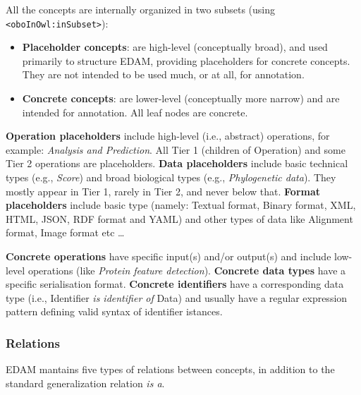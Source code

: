 \documentclass{scrartcl}
\begin{document}
All the concepts are internally organized in two subsets (using \texttt{<oboInOwl:inSubset>}):
\begin{itemize}
  \item \textbf{Placeholder concepts}: are high-level (conceptually broad), and used primarily 
    to structure EDAM, providing placeholders for concrete concepts. 
    They are not intended to be used much, or at all, for annotation.
  \item \textbf{Concrete concepts}: are lower-level (conceptually more narrow) and are intended for annotation. 
    All leaf nodes are concrete.

\end{itemize}

\textbf{Operation placeholders} include high-level (i.e., abstract) operations, for example: 
  \textit{Analysis and Prediction}. All Tier 1 (children of Operation) and some 
  Tier 2 operations are placeholders. \textbf{Data placeholders} include basic technical types 
  (e.g., \textit{Score}) and broad biological types (e.g., \textit{ Phylogenetic data}).
  They mostly appear in Tier 1, rarely in Tier 2, and never below that.
  \textbf{Format placeholders} include basic type
    (namely: Textual format, Binary format, XML, HTML, JSON, RDF format and YAML) and 
    other types of data like Alignment format, Image format etc \dots

\textbf{Concrete operations} have specific input(s) and/or output(s) and include low-level 
  operations (like \textit{Protein feature detection}). \textbf{Concrete data types} have 
  a specific serialisation format. \textbf{Concrete identifiers} have a corresponding
  data type (i.e., Identifier \textit{is identifier of} Data) and usually have a regular 
  expression pattern defining valid syntax of identifier istances. 
 
\newpage

\subsubsection{Relations}

EDAM mantains five types of relations between concepts, 
  in addition to the standard generalization relation 
  \textit{is a}.
\end{document}
